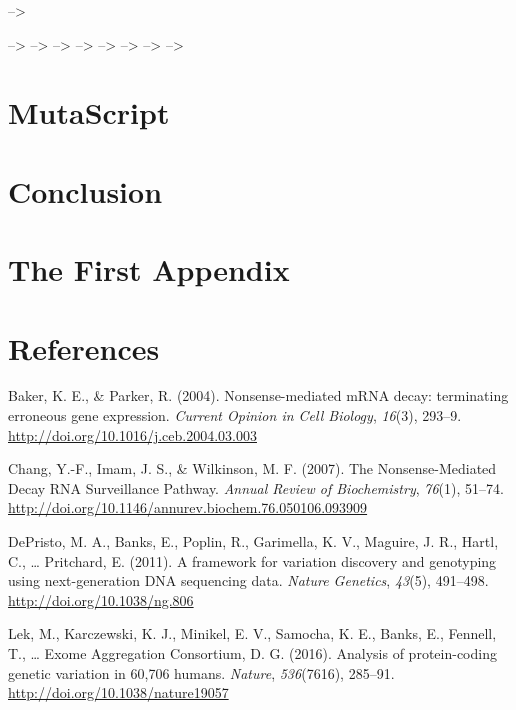 \documentclass[12pt,twoside]{reedthesis}
\theoremstyle{definition}
\theoremstyle{definition}
\theoremstyle{remark}
\begin{document}
  --\textgreater{}
  
  --\textgreater{} --\textgreater{} --\textgreater{} --\textgreater{}
  --\textgreater{} --\textgreater{} --\textgreater{} --\textgreater{}
  
  \chapter{MutaScript}\label{mutascript}
  
  \chapter*{Conclusion}\label{conclusion}
  
  \chapter{The First Appendix}\label{the-first-appendix}
  
  \chapter*{References}\label{references}
  
  \hypertarget{refs}{}
  \hypertarget{ref-Baker2004}{}
  Baker, K. E., \& Parker, R. (2004). Nonsense-mediated mRNA decay:
  terminating erroneous gene expression. \emph{Current Opinion in Cell
  Biology}, \emph{16}(3), 293--9.
  \url{http://doi.org/10.1016/j.ceb.2004.03.003}
  
  \hypertarget{ref-Chang2007}{}
  Chang, Y.-F., Imam, J. S., \& Wilkinson, M. F. (2007). The
  Nonsense-Mediated Decay RNA Surveillance Pathway. \emph{Annual Review of
  Biochemistry}, \emph{76}(1), 51--74.
  \url{http://doi.org/10.1146/annurev.biochem.76.050106.093909}
  
  \hypertarget{ref-DePristo2011}{}
  DePristo, M. A., Banks, E., Poplin, R., Garimella, K. V., Maguire, J.
  R., Hartl, C., \ldots{} Pritchard, E. (2011). A framework for variation
  discovery and genotyping using next-generation DNA sequencing data.
  \emph{Nature Genetics}, \emph{43}(5), 491--498.
  \url{http://doi.org/10.1038/ng.806}
  
  \hypertarget{ref-Lek2016}{}
  Lek, M., Karczewski, K. J., Minikel, E. V., Samocha, K. E., Banks, E.,
  Fennell, T., \ldots{} Exome Aggregation Consortium, D. G. (2016).
  Analysis of protein-coding genetic variation in 60,706 humans.
  \emph{Nature}, \emph{536}(7616), 285--91.
  \url{http://doi.org/10.1038/nature19057}
  
\end{document}
